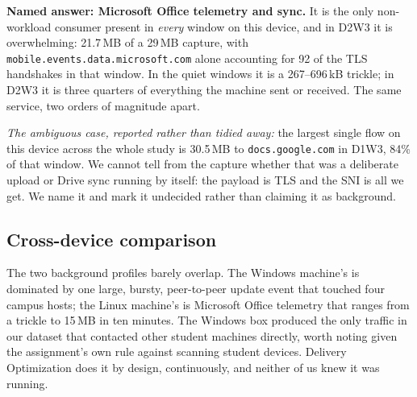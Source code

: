 \textbf{Named answer: Microsoft Office telemetry and sync.} It is the only non-workload consumer
present in \emph{every} window on this device, and in D2W3 it is overwhelming: 21.7\,MB of a
29\,MB capture, with \texttt{mobile.events.data.microsoft.com} alone accounting for 92 of the TLS
handshakes in that window. In the quiet windows it is a 267--696\,kB trickle; in D2W3 it is three
quarters of everything the machine sent or received. The same service, two orders of magnitude
apart.

\emph{The ambiguous case, reported rather than tidied away:} the largest single flow on this
device across the whole study is 30.5\,MB to \texttt{docs.google.com} in D1W3, 84\% of that
window. We cannot tell from the capture whether that was a deliberate upload or Drive sync
running by itself: the payload is TLS and the SNI is all we get. We name it and mark it
undecided rather than claiming it as background.

\subsection{Cross-device comparison}

The two background profiles barely overlap. The Windows machine's is dominated by one large,
bursty, peer-to-peer update event that touched four campus hosts; the Linux machine's is
Microsoft Office telemetry that ranges from a trickle to 15\,MB in ten minutes. The Windows box
produced the only traffic in our dataset that contacted other student machines directly,
worth noting given the assignment's own rule against scanning student devices. Delivery
Optimization does it by design, continuously, and neither of us knew it was running.
